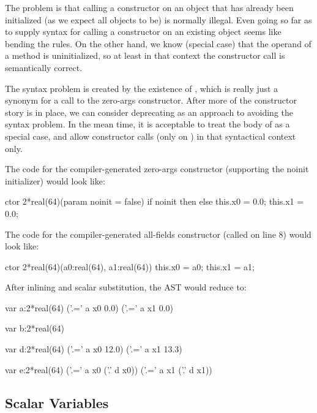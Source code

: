 The problem is that calling a constructor on an object that has already been initialized
(as we expect all objects to be) is normally illegal.  Even going so far as to supply
syntax for calling a constructor on an existing object seems like bending the rules.  On
the other hand, we know (special case) that the operand of a  method is
uninitialized, so at least in that context the constructor call is semantically correct.

The syntax problem is created by the existence of , which is really
just a synonym for a call to the zero-args constructor.  After more of the constructor
story is in place, we can consider deprecating  as an approach to
avoiding the syntax problem.  In the mean time, it is acceptable to treat the body of
 as a special case, and allow constructor calls (only on )
in that syntactical context only.

The code for the compiler-generated zero-args constructor (supporting the noinit
initializer) would look like:
\begin{chapel}
  ctor 2*real(64)(param noinit = false) {
    if noinit then { }
    else { this.x0 = 0.0; this.x1 = 0.0; }
  }
\end{chapel}

The code for the compiler-generated all-fields constructor (called on line 8) would look
like:
\begin{chapel}
  ctor 2*real(64)(a0:real(64), a1:real(64)) {
    this.x0 = a0; this.x1 = a1;
  }
\end{chapel}
After inlining and scalar substitution, the AST would reduce to:
\begin{numberedchapel}
  var a:2*real(64)
  ('.=' a x0 0.0)
  ('.=' a x1 0.0)

  var b:2*real(64)

  var d:2*real(64)
  ('.=' a x0 12.0)
  ('.=' a x1 13.3)

  var e:2*real(64)
  ('.=' a x0 ('.' d x0))
  ('.=' a x1 ('.' d x1))
\end{numberedchapel}


\subsection{Scalar Variables}

